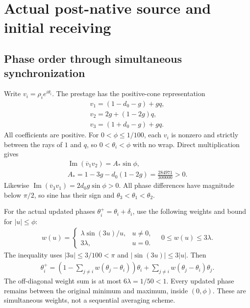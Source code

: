 \section{Actual post-native source and initial receiving}\label{sec:activity}
\subsection{Phase order through simultaneous synchronization}\label{sec:phaseorder}
Write $v_i=\rho_i e^{i\theta_i}$. The prestage has the positive-cone representation
\begin{equation}\label{eq:a33}%
\begin{gathered}
v_1=(1-d_0-g)+gq,\\ v_2=2g+(1-2g)q,\\ v_3=(1+d_0-g)+gq.
\end{gathered}
\end{equation}
All coefficients are positive. For $0<\phi\le1/100$, each $v_i$ is nonzero and strictly between the rays of $1$ and $q$, so $0<\theta_i<\phi$ with no wrap. Direct multiplication gives
\begin{equation}\label{eq:a34}%
\begin{gathered}
\operatorname{Im}(\overline v_1v_2)=A_*\sin\phi,\\ A_*=1-3g-d_0(1-2g)=\frac{284971}{300000}>0.
\end{gathered}
\end{equation}
Likewise $\operatorname{Im}(\overline v_3v_1)=2d_0g\sin\phi>0$. All phase differences have magnitude below $\pi/2$, so sine has their sign and $\theta_3<\theta_1<\theta_2$.

For the actual updated phases $\theta_i^+=\theta_i+\delta_i$, use the following weights and bound for $|u|\le\phi$:
\begin{equation}\label{eq:a35}%
\begin{gathered}
w(u)=\begin{cases}\lambda\sin(3u)/u,&u\ne0,\\3\lambda,&u=0.\end{cases}
\quad 0\le w(u)\le3\lambda .
\end{gathered}
\end{equation}
The inequality uses $|3u|\le3/100<\pi$ and $|\sin(3u)|\le3|u|$. Then
\begin{equation}\label{eq:a36}%
\begin{gathered}
\theta_i^+=\left(1-\sum_{j\ne i}w(\theta_j-\theta_i)\right)\theta_i+
\sum_{j\ne i}w(\theta_j-\theta_i)\theta_j.
\end{gathered}
\end{equation}
The off-diagonal weight sum is at most $6\lambda=1/50<1$. Every updated phase remains between the original minimum and maximum, inside $(0,\phi)$. These are simultaneous weights, not a sequential averaging scheme.

